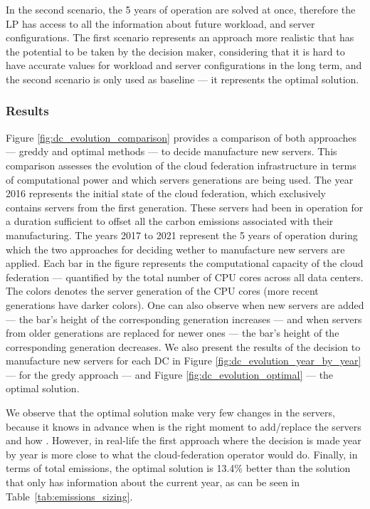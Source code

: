 In the second scenario, the 5 years of operation are solved at once, therefore the LP has access to all the information about future workload, and server configurations. The first scenario represents an approach more realistic that has the potential to be taken by the decision maker, considering that it is hard to have accurate values for workload and server configurations in the long term, and the second scenario is only used as baseline --- it represents the optimal solution.

\subsubsection{Results}

Figure \ref{fig:dc_evolution_comparison} provides a comparison of both approaches --- greddy and optimal methods --- to decide manufacture new servers.   This comparison assesses the evolution of the cloud federation infrastructure in terms of computational power and which servers generations are being used. The year 2016 represents the initial state of the cloud federation, which exclusively contains servers from the first generation. These servers had been in operation for a duration sufficient to offset all the carbon emissions associated with their manufacturing. The years 2017 to 2021 represent the 5 years of operation during which the two approaches for deciding wether to manufacture new servers are applied. Each bar in the figure represents the computational capacity of the cloud federation --- quantified by the total number of CPU cores across all data centers. The colors denotes the server generation of the CPU cores  (more recent generations have darker colors). One can also observe when new servers are added ---  the bar's height of the corresponding generation increases --- and when servers from older generations are replaced for newer ones ---  the bar's height of the corresponding generation decreases. We also present the results of the decision to manufacture new servers for each DC in Figure \ref{fig:dc_evolution_year_by_year} --- for the gredy approach --- and Figure \ref{fig:dc_evolution_optimal} ---  the optimal solution.

We observe that the optimal solution make very few changes in the servers, because it knows in advance when is the right moment to add/replace the servers and how . However, in real-life the first approach where the decision is made year by year is more close to what the cloud-federation operator would do. Finally, in terms of total  emissions, the optimal solution is 13.4\% better than the solution that only has information about the current year, as can be seen in Table~\ref{tab:emissions_sizing}.

